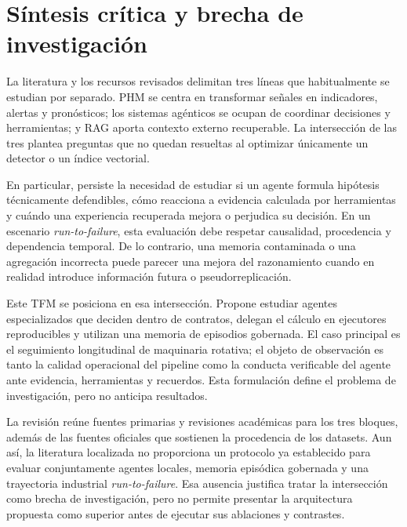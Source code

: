 \section{Síntesis crítica y brecha de investigación}

La literatura y los recursos revisados delimitan tres líneas que habitualmente
se estudian por separado. PHM se centra en transformar señales en indicadores,
alertas y pronósticos; los sistemas agénticos se ocupan de coordinar decisiones
y herramientas; y RAG aporta contexto externo recuperable. La intersección de
las tres plantea preguntas que no quedan resueltas al optimizar únicamente un
detector o un índice vectorial.

En particular, persiste la necesidad de estudiar si un agente formula hipótesis
técnicamente defendibles, cómo reacciona a evidencia calculada por herramientas
y cuándo una experiencia recuperada mejora o perjudica su decisión. En un
escenario \textit{run-to-failure}, esta evaluación debe respetar causalidad,
procedencia y dependencia temporal. De lo contrario, una memoria contaminada o
una agregación incorrecta puede parecer una mejora del razonamiento cuando en
realidad introduce información futura o pseudorreplicación.

Este TFM se posiciona en esa intersección. Propone estudiar agentes especializados
que deciden dentro de contratos, delegan el cálculo en ejecutores reproducibles
y utilizan una memoria de episodios gobernada. El caso principal es el
seguimiento longitudinal de maquinaria rotativa; el objeto de observación es
tanto la calidad operacional del pipeline como la conducta verificable del
agente ante evidencia, herramientas y recuerdos. Esta formulación define el
problema de investigación, pero no anticipa resultados.

La revisión reúne fuentes primarias y revisiones académicas para los tres
bloques, además de las fuentes oficiales que sostienen la procedencia de los
datasets. Aun así, la literatura localizada no proporciona un protocolo ya
establecido para evaluar conjuntamente agentes locales, memoria episódica
gobernada y una trayectoria industrial \textit{run-to-failure}. Esa ausencia
justifica tratar la intersección como brecha de investigación, pero no permite
presentar la arquitectura propuesta como superior antes de ejecutar sus
ablaciones y contrastes.

